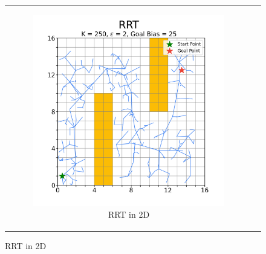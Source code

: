 
\begin{figure}[H]
\begin{centering}
\begin{tabular}{cc}

    \begin{subfigure}{0.47\linewidth}
    \includegraphics[width=\linewidth]{chapters/chapter2/img/visualizing/tree2d.png}
    \caption{RRT in 2D}
    \end{subfigure} &


\end{tabular}
\end{centering}
\end{figure}
